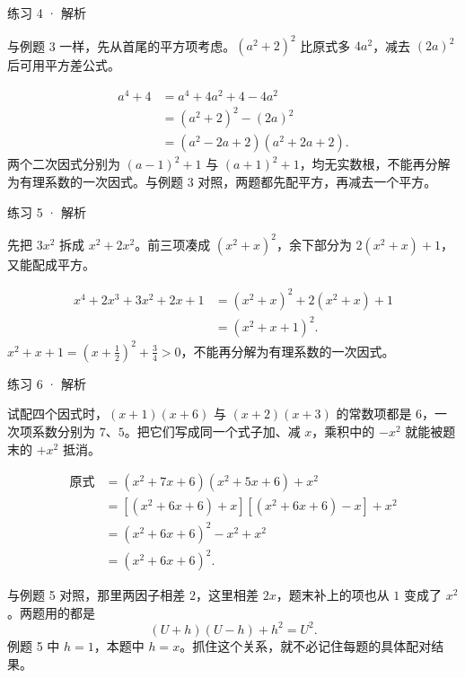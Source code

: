 
\begin{solution}[before skip=4pt plus 1pt,after skip=4pt plus 1pt,top=6pt,bottom=6pt]{练习 4 · 解析}

\think 与例题 3 一样，先从首尾的平方项考虑。$(a^2+2)^2$ 比原式多 $4a^2$，减去 $(2a)^2$ 后可用平方差公式。

\solve \begin{align*}
a^4+4&=a^4+4a^2+4-4a^2\\
&=(a^2+2)^2-(2a)^2\\
&=(a^2-2a+2)(a^2+2a+2).
\end{align*}
两个二次因式分别为 $(a-1)^2+1$ 与 $(a+1)^2+1$，均无实数根，不能再分解为有理系数的一次因式。与例题 3 对照，两题都先配平方，再减去一个平方。


\end{solution}


\begin{solution}[breakable=false,before skip=4pt plus 1pt,after skip=4pt plus 1pt,top=6pt,bottom=6pt]{练习 5 · 解析}

\think 先把 $3x^2$ 拆成 $x^2+2x^2$。前三项凑成 $(x^2+x)^2$，余下部分为 $2(x^2+x)+1$，又能配成平方。

\solve \begin{align*}
x^4+2x^3+3x^2+2x+1&=(x^2+x)^2+2(x^2+x)+1\\
&=(x^2+x+1)^2.
\end{align*}
$x^2+x+1=(x+\frac12)^2+\frac34>0$，不能再分解为有理系数的一次因式。


\end{solution}




\begin{solution}[before skip=4pt plus 1pt,after skip=4pt plus 1pt,top=6pt,bottom=6pt]{练习 6 · 解析}

\think 试配四个因式时，$(x+1)(x+6)$ 与 $(x+2)(x+3)$ 的常数项都是 $6$，一次项系数分别为 $7$、$5$。把它们写成同一个式子加、减 $x$，乘积中的 $-x^2$ 就能被题末的 $+x^2$ 抵消。

\solve \begin{align*}
\text{原式}&=(x^2+7x+6)(x^2+5x+6)+x^2\\
&=[(x^2+6x+6)+x][(x^2+6x+6)-x]+x^2\\
&=(x^2+6x+6)^2-x^2+x^2\\
&=(x^2+6x+6)^2.
\end{align*}

与例题 5 对照，那里两因子相差 $2$，这里相差 $2x$，题末补上的项也从 $1$ 变成了 $x^2$。两题用的都是
\[(U+h)(U-h)+h^2=U^2.\]
例题 5 中 $h=1$，本题中 $h=x$。抓住这个关系，就不必记住每题的具体配对结果。


\end{solution}

